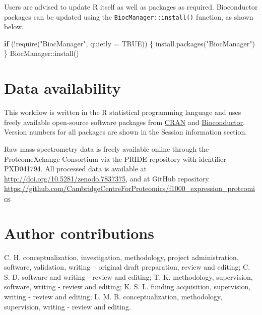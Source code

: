 \documentclass[9pt,a4paper,]{extarticle}
\newenvironment{Shaded}{\begin{snugshade}}{\end{snugshade}}
\newcommand{\AttributeTok}[1]{\textcolor[rgb]{0.77,0.63,0.00}{#1}}
\newcommand{\ConstantTok}[1]{\textcolor[rgb]{0.00,0.00,0.00}{#1}}
\newcommand{\ControlFlowTok}[1]{\textcolor[rgb]{0.13,0.29,0.53}{\textbf{#1}}}
\newcommand{\FunctionTok}[1]{\textcolor[rgb]{0.00,0.00,0.00}{#1}}
\newcommand{\NormalTok}[1]{#1}
\newcommand{\SpecialCharTok}[1]{\textcolor[rgb]{0.00,0.00,0.00}{#1}}
\newcommand{\StringTok}[1]{\textcolor[rgb]{0.31,0.60,0.02}{#1}}
\begin{document}
Users are advised to update R itself as well as packages as required.
Bioconductor packages can be updated using the \texttt{BiocManager::install()}
function, as shown below.

\begin{Shaded}
\begin{Highlighting}[]
\ControlFlowTok{if}\NormalTok{ (}\SpecialCharTok{!}\FunctionTok{require}\NormalTok{(}\StringTok{"BiocManager"}\NormalTok{, }\AttributeTok{quietly =} \ConstantTok{TRUE}\NormalTok{)) \{}
  \FunctionTok{install.packages}\NormalTok{(}\StringTok{"BiocManager"}\NormalTok{)}
\NormalTok{\}}
\NormalTok{BiocManager}\SpecialCharTok{::}\FunctionTok{install}\NormalTok{()}
\end{Highlighting}
\end{Shaded}

\hypertarget{data-availability}{%
\section{Data availability}\label{data-availability}}

This workflow is written in the R statistical programming language and uses
freely available open-source software packages from \href{https://cran.r-project.org}{CRAN}
and \href{https://bioconductor.org}{Bioconductor}. Version numbers for all packages
are shown in the Session information section.

Raw mass spectrometry data is freely available online through the
ProteomeXchange Consortium via the PRIDE repository with identifier PXD041794.
All processed data is available at
\url{http://doi.org/10.5281/zenodo.7837375},
and at GitHub repository \url{https://github.com/CambridgeCentreForProteomics/f1000_expression_proteomics}.

\hypertarget{author-contributions}{%
\section{Author contributions}\label{author-contributions}}

C. H. conceptualization, investigation, methodology, project administration,
software, validation, writing -- original draft preparation, review and editing;
C. S. D. software and writing - review and editing; T. K. methodology,
supervision, software, writing - review and editing; K. S. L. funding acquisition,
supervision, writing - review and editing; L. M. B. conceptualization, methodology,
supervision, writing - review and editing.
\end{document}
